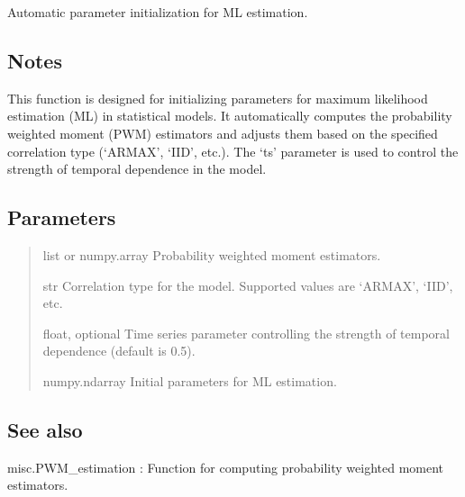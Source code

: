 \documentclass[a4paper,11pt,openany,english]{sphinxmanual}
\begin{document}

\begin{fulllineitems}
\label{\detokenize{api_topt:xtremes.topt.automatic_parameter_initialization}}
\pysigstartsignatures
{}
\pysigstopsignatures
\sphinxAtStartPar
Automatic parameter initialization for ML estimation.


\subsection{Notes}
\label{\detokenize{api_topt:id44}}
\sphinxAtStartPar
This function is designed for initializing parameters for maximum likelihood estimation (ML) in statistical models.
It automatically computes the probability weighted moment (PWM) estimators and adjusts them based on the specified
correlation type (‘ARMAX’, ‘IID’, etc.). The ‘ts’ parameter is used to control the strength of temporal dependence
in the model.


\subsection{Parameters}
\label{\detokenize{api_topt:id45}}\begin{quote}\begin{description}
\sphinxAtStartPar
list or numpy.array
Probability weighted moment estimators.

\sphinxAtStartPar
str
Correlation type for the model. Supported values are ‘ARMAX’, ‘IID’, etc.

\sphinxAtStartPar
float, optional
Time series parameter controlling the strength of temporal dependence (default is 0.5).

\sphinxAtStartPar
numpy.ndarray
Initial parameters for ML estimation.

\end{description}\end{quote}


\subsection{See also}
\label{\detokenize{api_topt:see-also}}
\sphinxAtStartPar
misc.PWM\_estimation : Function for computing probability weighted moment estimators.



\end{fulllineitems}
\end{document}
